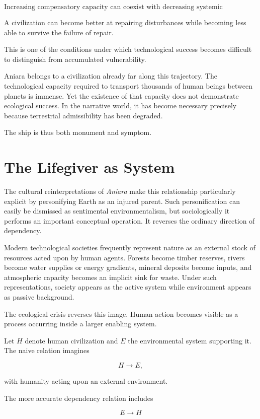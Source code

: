 \documentclass[11pt,oneside]{book}
\theoremstyle{definition}
\theoremstyle{remark}
\begin{document}
\[
\boxed{
\text{Increasing compensatory capacity can coexist with decreasing systemic robustness.}
}
\]

A civilization can become better at repairing disturbances while becoming less able to survive the failure of repair.

This is one of the conditions under which technological success becomes difficult to distinguish from accumulated vulnerability.

Aniara belongs to a civilization already far along this trajectory. The technological capacity required to transport thousands of human beings between planets is immense. Yet the existence of that capacity does not demonstrate ecological success. In the narrative world, it has become necessary precisely because terrestrial admissibility has been degraded.

The ship is thus both monument and symptom.

\section{The Lifegiver as System}

The cultural reinterpretations of \emph{Aniara} make this relationship particularly explicit by personifying Earth as an injured parent. Such personification can easily be dismissed as sentimental environmentalism, but sociologically it performs an important conceptual operation. It reverses the ordinary direction of dependency.

Modern technological societies frequently represent nature as an external stock of resources acted upon by human agents. Forests become timber reserves, rivers become water supplies or energy gradients, mineral deposits become inputs, and atmospheric capacity becomes an implicit sink for waste. Under such representations, society appears as the active system while environment appears as passive background.

The ecological crisis reverses this image. Human action becomes visible as a process occurring inside a larger enabling system.

Let \(H\) denote human civilization and \(E\) the environmental system supporting it. The naive relation imagines

\[
H\rightarrow E,
\]

with humanity acting upon an external environment.

The more accurate dependency relation includes

\[
E\rightarrow H
\]
\end{document}
